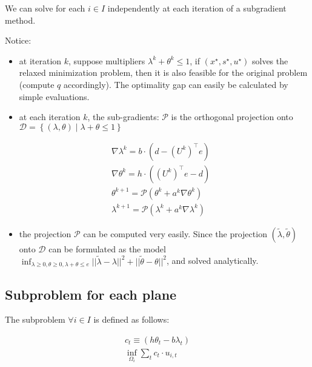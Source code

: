 \documentclass[
  a4paper,
,tablecaptionabove
]{scrartcl}
\numberwithin{equation}{section}
\providecommand{\tightlist}{%
  \setlength{\itemsep}{0pt}\setlength{\parskip}{0pt}}
\begin{document}
We can solve for each \(i\in I\) independently at each iteration of a
subgradient method.

Notice:

\begin{itemize}
  \tightlist
  \item
        at iteration \(k\), suppose multipliers
        \(\lambda^k + \theta^k \le 1\), if \(( x^\star, s^\star, u^\star)\)
        solves the relaxed minimization problem, then it is also feasible for
        the original problem (compute \(q\) accordingly). The optimality gap
        can easily be calculated by simple evaluations.
  \item
        at each iteration \(k\), the sub-gradients: \(\mathcal P\) is the
        orthogonal projection onto
        \(\mathcal D =\left\{(\lambda, \theta) \;| \; \lambda + \theta \le 1\right\}\)
\end{itemize}

\[\begin{aligned}
     & \nabla \lambda^k = b\cdot \left(d -  (U^k)^\top e\right)     \\
     & \nabla \theta^k = h\cdot \left((U^k)^\top e - d\right)       \\
     & \theta^{k+1} = \mathcal P (\theta^k + a^k\nabla\theta^k )    \\
     & \lambda^{k+1} = \mathcal P (\lambda^k + a^k\nabla\lambda^k )
  \end{aligned}\]

\begin{itemize}
  \tightlist
  \item
        the projection \(\mathcal P\) can be computed very easily. Since the
        projection \((\tilde\lambda, \tilde\theta)\) onto \(\mathcal D\) can
        be formulated as the model
        \(\inf_{\lambda\ge 0, \theta \ge 0, \lambda + \theta \le e} ||\tilde\lambda-\lambda||^2 + ||\tilde\theta - \theta||^2\),
        and solved analytically.
\end{itemize}

\hypertarget{subproblem-for-each-plane}{%
  \subsection{Subproblem for each plane}\label{subproblem-for-each-plane}}

The subproblem \(\forall i\in I\) is defined as follows:

\[\begin{aligned}
    c_t \equiv (h\theta_t - b\lambda_t) \\
    \inf_{\Omega_i} \sum_t c_t \cdot u_{i,t}
  \end{aligned}\]
\end{document}
